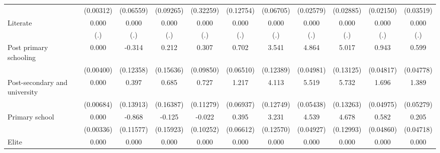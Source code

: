 {\begin{tabular}{l*{10}{c}}
                    &   (0.00312)         &   (0.06559)         &   (0.09265)         &   (0.32259)         &   (0.12754)         &   (0.06705)         &   (0.02579)         &   (0.02885)         &   (0.02150)         &   (0.03519)         \\
Literate            &       0.000         &       0.000         &       0.000         &       0.000         &       0.000         &       0.000         &       0.000         &       0.000         &       0.000         &       0.000         \\
                    &         (.)         &         (.)         &         (.)         &         (.)         &         (.)         &         (.)         &         (.)         &         (.)         &         (.)         &         (.)         \\
Post primary schooling&       0.000         &      -0.314\sym{*}  &       0.212         &       0.307\sym{**} &       0.702\sym{***}&       3.541\sym{***}&       4.864\sym{***}&       5.017\sym{***}&       0.943\sym{***}&       0.599\sym{***}\\
                    &   (0.00400)         &   (0.12358)         &   (0.15636)         &   (0.09850)         &   (0.06510)         &   (0.12389)         &   (0.04981)         &   (0.13125)         &   (0.04817)         &   (0.04778)         \\
Post-secondary and university&       0.000         &       0.397\sym{**} &       0.685\sym{***}&       0.727\sym{***}&       1.217\sym{***}&       4.113\sym{***}&       5.519\sym{***}&       5.732\sym{***}&       1.696\sym{***}&       1.389\sym{***}\\
                    &   (0.00684)         &   (0.13913)         &   (0.16387)         &   (0.11279)         &   (0.06937)         &   (0.12749)         &   (0.05438)         &   (0.13263)         &   (0.04975)         &   (0.05279)         \\
Primary school      &       0.000         &      -0.868\sym{***}&      -0.125         &      -0.022         &       0.395\sym{***}&       3.231\sym{***}&       4.539\sym{***}&       4.678\sym{***}&       0.582\sym{***}&       0.205\sym{***}\\
                    &   (0.00336)         &   (0.11577)         &   (0.15923)         &   (0.10252)         &   (0.06612)         &   (0.12570)         &   (0.04927)         &   (0.12993)         &   (0.04860)         &   (0.04718)         \\
Elite               &       0.000         &       0.000         &       0.000         &       0.000         &       0.000         &       0.000         &       0.000         &       0.000         &       0.000         &       0.000         \\

\end{tabular}}
